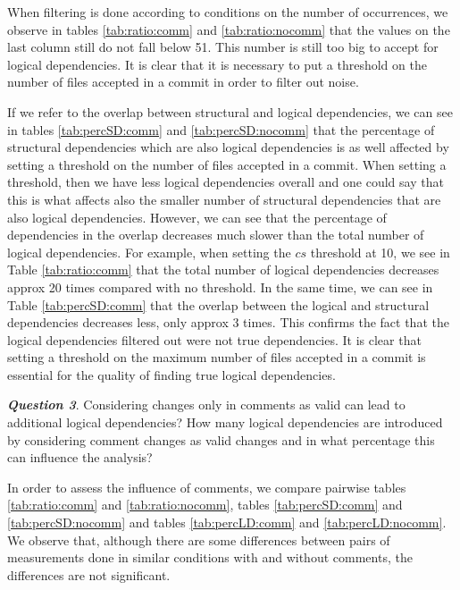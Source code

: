 \documentclass[a4paper,twoside]{article}
\begin{document}
When filtering is done according to conditions on the number of occurrences, we observe in tables \ref{tab:ratio:comm} and \ref{tab:ratio:nocomm} that the values on the last column still do not fall below 51. This number is still too big to accept for logical dependencies.  It is clear that it is necessary to  put a threshold on the number of files accepted in a commit in order to filter out noise.


If we refer to the overlap between structural and logical dependencies, we can see in tables \ref{tab:percSD:comm} and \ref{tab:percSD:nocomm} that the percentage of structural dependencies which are also logical dependencies is as well affected by setting a threshold on the number of files accepted in a commit. When setting a threshold, then we have less logical dependencies overall and one could say that this is what affects also the smaller number of structural dependencies that are also logical dependencies. However, we can see that the percentage of dependencies in the overlap decreases much slower than the total number of logical dependencies. For example, when setting  the $cs$ threshold at 10, we see in Table \ref{tab:ratio:comm} that the total number of logical dependencies decreases approx 20 times compared with no threshold. In the same time, we can see in Table \ref{tab:percSD:comm}  that the overlap between the logical and structural dependencies decreases less, only approx 3 times. This confirms the fact that the logical dependencies filtered out were not true dependencies. It is clear that setting a threshold on the maximum number of files accepted in a commit is essential for the quality of finding true logical dependencies.


\textit{\textbf{Question 3}}. Considering changes only in comments as valid can lead to additional logical dependencies? How many logical dependencies are introduced by considering comment changes as valid changes and in what percentage this can influence the analysis?

In order to assess the influence of comments, we compare pairwise tables \ref{tab:ratio:comm} and \ref{tab:ratio:nocomm},  
tables \ref{tab:percSD:comm} and \ref{tab:percSD:nocomm} and tables \ref{tab:percLD:comm} and \ref{tab:percLD:nocomm}. 
We observe that, although there are some differences between pairs of measurements done in similar conditions with and without comments, the differences are not significant.
\end{document}
